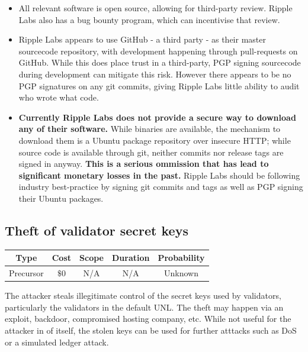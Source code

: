 \documentclass{article}
\begin{document}
\begin{itemize}

    \item All relevant software is open source, allowing for third-party
        review. Ripple Labs also has a bug bounty program, which can
        incentivise that review.

    \item Ripple Labs appears to use GitHub - a third party -
        as their master sourcecode repository, with development happening
        through pull-requests on GitHub. While this does place trust in a
        third-party, PGP signing sourcecode during development can mitigate
        this risk. However there appears to be no PGP signatures on any git
        commits, giving Ripple Labs little ability to audit who wrote what
        code.

    \item \textbf{Currently Ripple Labs does not provide a secure way to
        download any of their software.} While binaries are available, the
        mechanism to download them is a Ubuntu package repository over insecure
        HTTP; while source code is available through git, neither commits nor
        release tags are signed in anyway. \textbf{This is a serious ommission
        that has lead to significant monetary losses in the past.} Ripple Labs
        should be following industry best-practice by signing git commits and
        tags\cite{wladimir-git-pgp} as well as PGP signing their Ubuntu
        packages.

\end{itemize}


\subsection{Theft of validator secret keys}

\begin{center}
    \begin{tabular}{c|c|c|c|c}
        Type & Cost & Scope & Duration & Probability \\ \hline
        Precursor & $\$0$ & N/A & N/A & Unknown \\
    \end{tabular}
\end{center}

The attacker steals illegitimate control of the secret keys used by validators,
particularly the validators in the default UNL. The theft may happen via an
exploit, backdoor, compromised hosting company, etc. While not useful for the
attacker in of itself, the stolen keys can be used for further atttacks such as
DoS or a simulated ledger attack.
\end{document}
